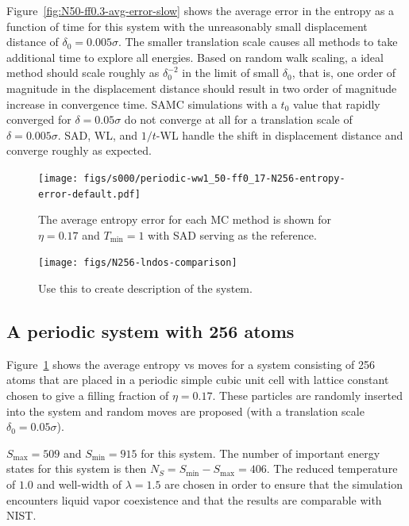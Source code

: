 \documentclass[letterpaper,twocolumn,amsmath,amssymb,pre,aps,10pt]{revtex4-1}
\begin{document}
Figure~\ref{fig:N50-ff0.3-avg-error-slow} shows the average error in
the entropy as a function of time for this system with the
unreasonably small displacement distance of $\delta_0 = 0.005\sigma$.
%
The smaller translation scale causes all methods to take additional
time to explore all energies. Based on random walk scaling, a ideal
method should scale roughly as $\delta_0^{-2}$ in the limit of small
$\delta_0$, that is, one order of magnitude in the displacement
distance should result in two order of magnitude increase in
convergence time. SAMC simulations with a $t_0$ value that rapidly
converged for $\delta = 0.05\sigma$ do not converge at all for a
translation scale of $\delta = 0.005\sigma$. SAD, WL, and $1/t$-WL
handle the shift in displacement distance and converge roughly as
expected.

\begin{figure}
\texttt{[image: figs/s000/periodic-ww1\_50-ff0\_17-N256-entropy-error-default.pdf]}
  \caption{The average entropy error for each MC method is shown for $\eta = 0.17$ and $T_{\min} = 1$ with
  SAD serving as the reference.}\label{fig:n256}
\end{figure}
\begin{figure}
  \texttt{[image: figs/N256-lndos-comparison]}
  \caption{Use this to create description of the system.}\label{fig:n256-lndos-comparison}
\end{figure}


\subsection{A periodic system with 256 atoms}

Figure~\ref{fig:n256} shows the average entropy vs moves for a system
consisting of 256 atoms that are placed in a periodic simple cubic unit
cell with lattice constant chosen to give a filling fraction of $\eta =
0.17$.   These particles are randomly inserted into the system and
random moves are proposed (with a translation scale $\delta_0 =
0.05\sigma$).

{\color{red}
$S_{\max} = 509$ and $S_{\min} = 915$ for this system.  The number of
important energy states for this system is then $N_S = S_{\min} -
S_{\max} = 406$. The reduced temperature of $1.0$ and well-width of $\lambda = 1.5$
are chosen in order to ensure that the simulation encounters liquid vapor coexistence
and that the results are comparable with NIST.
}
\end{document}
